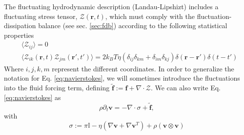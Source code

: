 \documentclass[twoside,openright,titlepage,numbers=noenddot,%
headinclude,footinclude,cleardoublepage=empty,abstract=on,
BCOR=5mm,fontsize=11pt, dvipsnames, paper=b5
]{scrreprt}
\renewcommand{\vec}[1]{\bm{#1}}
\newcommand{\tens}[1]{\bm{\mathcal{#1}}}
\newcommand{\kT}{k_B T}
\newcommand{\fpos}{r}
\newcommand{\fvel}{v}
\begin{document}
The fluctuating hydrodynamic description (Landau-Lipshizt) includes a fluctuating stress tensor, $\mathcal{Z}(\vec{\fpos}, t)$, which must comply with the fluctuation-dissipation balance (see sec. \ref{sec:fdb}) according to the following statistical properties~\cite{Zarate2006}
\begin{equation}
  \label{eq:navierstkesnoise}
  \begin{aligned}
&  \langle \mathcal Z_{ij}\rangle = 0\\
&  \langle \mathcal Z_{ik}(\vec{\fpos},t)\mathcal Z_{jm}(\vec{\fpos}',t')\rangle = 2\kT\eta(\delta_{ij}\delta_{km} + \delta_{im}\delta_{kj})\delta(\vec{\fpos}-\vec{\fpos}')\delta(t-t')
\end{aligned}
\end{equation}
Where $i,j,k,m$ represent the different coordinates.
In order to generalize the notation for Eq. \eqref{eq:navierstokes}, we will sometimes introduce the fluctuations into the fluid forcing term, defining $\tilde{\vec{f}} := \vec{f} + \nabla\cdot\mathcal{Z}$.
We can also write Eq. \eqref{eq:navierstokes} as
\begin{equation}
  \label{eq:navierstokes2}
  \rho\partial_t\vec{\fvel} = -\nabla\cdot \tens{\sigma} + \tilde{\vec{f}},
\end{equation}
with
\begin{equation}
  \tens{\sigma} := \pi\mathbb{I} - \eta\left(\nabla \vec{\fvel} + \nabla\vec{\fvel}^T\right) + \rho\left(\vec{\fvel}\otimes\vec{\fvel}\right)
\end{equation}
\end{document}
